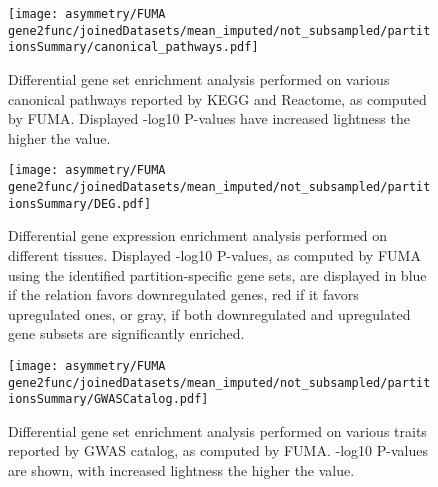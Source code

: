\begin{figure}[H]
	\centering
	\texttt{[image: asymmetry/FUMA gene2func/joinedDatasets/mean\_imputed/not\_subsampled/partitionsSummary/canonical\_pathways.pdf]}
	
	\caption[Canonical pathways gene set enrichment analysis]{Differential gene set enrichment analysis performed on various canonical pathways reported by KEGG and Reactome, as computed by FUMA. Displayed -log10 P-values have increased lightness the higher the value.}
	\label{fig:can_pathways}
\end{figure}
\begin{figure}[H]
	\centering
	\texttt{[image: asymmetry/FUMA gene2func/joinedDatasets/mean\_imputed/not\_subsampled/partitionsSummary/DEG.pdf]}
	
	\caption[Differential gene expression enrichment analysis]{Differential gene expression enrichment analysis performed on different tissues. Displayed -log10 P-values, as computed by FUMA using the identified partition-specific gene sets, are displayed in blue if the relation favors downregulated genes, red if it favors upregulated ones, or gray, if both downregulated and upregulated gene subsets are significantly enriched.}
	\label{fig:de_genes}
\end{figure}
\begin{figure}[H]
	\centering
	\texttt{[image: asymmetry/FUMA gene2func/joinedDatasets/mean\_imputed/not\_subsampled/partitionsSummary/GWASCatalog.pdf]}
	
	\caption[GWAS Catalog gene set enrichment analysis]{Differential gene set enrichment analysis performed on various traits reported by GWAS catalog, as computed by FUMA. -log10 P-values are shown, with increased lightness the higher the value.}
	\label{fig:gw_catalog}
\end{figure}
